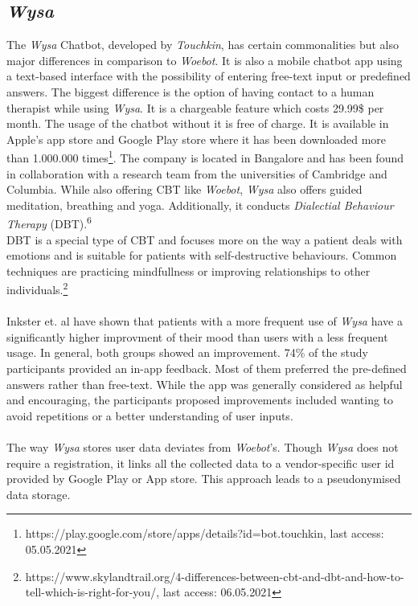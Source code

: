 \documentclass[sigconf, nonacm]{acmart}
\begin{document}
\subsection{\emph{Wysa}}
The \emph{Wysa} Chatbot, developed by \emph{Touchkin}, has certain commonalities but also major differences in comparison to \emph{Woebot}. It is also a mobile chatbot app using a text-based interface with the possibility of entering 
free-text input or predefined answers. The biggest difference is the option of having contact to 
a human therapist while using \emph{Wysa}. It is a chargeable feature which costs 29.99\$ per month. The usage of the chatbot without it is free of charge. It is available
in Apple's app store and Google Play store where it has been downloaded more than 1.000.000 times\footnote{https://play.google.com/store/apps/details?id=bot.touchkin, last access: 05.05.2021}. 
The company is located in Bangalore and has been found in collaboration with a research team from the universities of Cambridge and Columbia.
While also offering CBT like \emph{Woebot}, \emph{Wysa} also offers guided meditation, breathing and yoga. Additionally, it conducts \emph{Dialectial Behaviour Therapy} (DBT).\textsuperscript{6} 
\\
DBT is a special type of CBT and focuses more on the way a patient deals with emotions and is suitable for patients with self-destructive behaviours. Common techniques are practicing mindfullness or 
improving relationships to other individuals.\footnote{https://www.skylandtrail.org/4-differences-between-cbt-and-dbt-and-how-to-tell-which-is-right-for-you/, last access: 06.05.2021} 
\\\\
Inkster et. al \cite{Inkster} have shown that patients with a more frequent use of \emph{Wysa} have a significantly higher improvment of their mood than users
with a less frequent usage. In general, both groups showed an improvement. 74\% of the study participants provided an in-app feedback. Most of them preferred the pre-defined answers rather than free-text.
While the app was generally considered as helpful and encouraging, the participants proposed improvements included wanting to avoid repetitions or a better understanding of user inputs.
\\\\
The way \emph{Wysa} stores user data deviates from \emph{Woebot}'s. Though \emph{Wysa} does not require a registration, it links all the collected data to a vendor-specific user id provided by Google Play or App store. This approach leads to a pseudonymised data storage.
\end{document}
